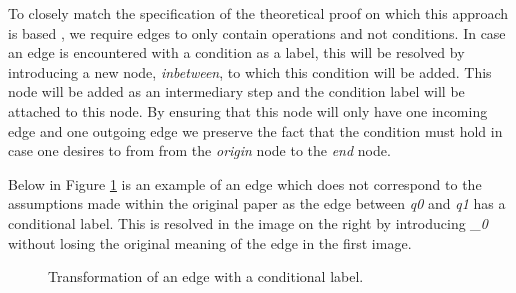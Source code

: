 \documentclass[12pt]{article}
\begin{document}
To closely match the specification of the theoretical proof on which this approach is based \cite{blondin2021continuous}, we require edges to only contain operations and not conditions. In case an edge is encountered with a condition as a label, this will be resolved by introducing a new node, \textit{inbetween}, to which this condition will be added. This node will be added as an intermediary step and the condition label will be attached to this node. By ensuring that this node will only have one incoming edge and one outgoing edge we preserve the fact that the condition must hold in case one desires to from from the \textit{origin} node to the \textit{end} node. 

Below in Figure \ref{fig:edgetransformlabel} is an example of an edge which does not correspond to the assumptions made within the original paper as the edge between \textit{q0} and \textit{q1} has a conditional label. This is resolved in the image on the right by introducing \textit{\_0} without losing the original meaning of the edge in the first image.

\begin{figure}[h]%
	\centering
	\qquad
	\caption{Transformation of an edge with a conditional label.}
	\label{fig:edgetransformlabel}
\end{figure}
\end{document}
